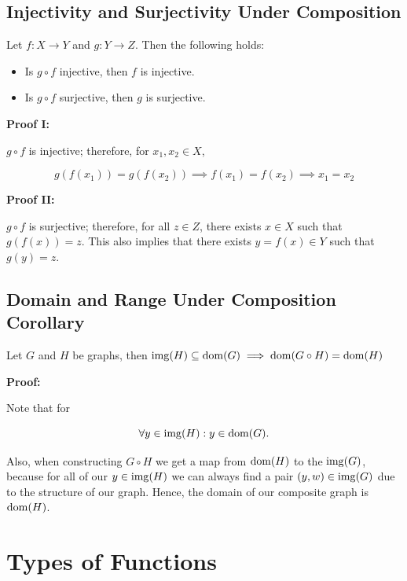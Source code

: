 \QED

\subsection{Injectivity and Surjectivity Under Composition}

Let \(f: X \to Y\) and \(g: Y \to Z\). Then the following holds:

\begin{itemize}

	\item Is \(g \circ f\) injective, then \(f\) is injective.

	\item Is \(g \circ f\) surjective, then \(g\) is surjective.

\end{itemize}

\textbf{Proof I:}

\(g \circ f\) is injective; therefore, for \(x_1, x_2 \in X\),

\[
	g(f(x_1)) = g(f(x_2)) \implies f(x_1) = f(x_2) \implies x_1 = x_2
\]

\QED

\textbf{Proof II:}

\(g \circ f\) is surjective; therefore, for all \(z \in Z\), there exists \(x \in X\) such that \(g(f(x)) = z\). This also
implies that there exists \(y = f(x) \in Y\) such that \(g(y) = z\).

\QED

\subsection{Domain and Range Under Composition Corollary}

Let \(G\) and \(H\) be graphs, then \(\mathrm{img}(H) \subseteq \mathrm{dom}(G) \implies \mathrm{dom}(G \circ H) = \mathrm{dom}(H)\)

\textbf{Proof:}

Note that for

\[
	\forall y \in \mathrm{img}(H) : y \in \mathrm{dom} (G).
\]

Also, when constructing \(G \circ H\) we get a map from \(\mathrm{dom}(H)\) to the \(\mathrm{img}(G)\), because for all
of our \(y \in \mathrm{img}(H)\) we can always find a pair \((y, w) \in \mathrm{img}(G)\) due to the structure of our graph. Hence,
the domain of our composite graph is \(\mathrm{dom}(H)\).

\QED

\section{Types of Functions}


